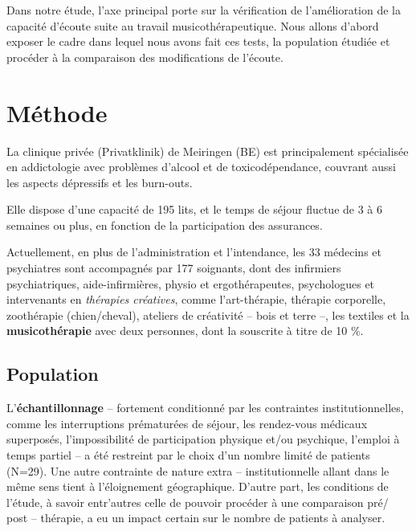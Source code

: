 
Dans notre étude, l'axe principal porte sur la
vérification de l'amélioration de
la capacité d'écoute suite au travail musicothérapeutique.
Nous allons
d'abord exposer le cadre dans lequel nous avons fait ces tests, la
population étudiée et procéder à la comparaison des modifications de
l'écoute.

\section{Méthode}

 La clinique privée (Privatklinik)
de Meiringen (BE) est  principalement spécialisée en
addictologie avec problèmes d'alcool et de toxicodépendance, couvrant aussi les aspects dépressifs
et les
burn-outs.


Elle dispose d'une capacité de 195 lits, et le temps de séjour fluctue de 3 à 6 semaines ou plus, en
fonction de la participation des assurances.

Actuellement, en plus de l'administration et l'intendance, les 33
médecins et psychiatres sont
accompagnés par 177
soignants, dont des infirmiers psychiatriques, aide-infirmières, physio et
ergothérapeutes,
psychologues et intervenants en \textit{thérapies
créatives}, comme l'art-thérapie, thérapie
corporelle, zoothérapie (chien/cheval),  ateliers de créativité --
bois et terre --,  les textiles et la\textbf{ musicothérapie} avec deux
personnes, dont la souscrite à titre de 10 \%.








\subsection{Population}
L'\textbf{échantillonnage} -- fortement conditionné par les contraintes
institutionnelles, comme les interruptions prématurées de séjour, les rendez-vous
 médicaux superposés, l'impossibilité de participation physique et/ou
 psychique,
 l'emploi à
 temps partiel -- a été restreint  par le choix d'un nombre limité de
 patients (N=29).
Une autre contrainte de nature extra -- institutionnelle allant dans le
même sens tient à l'éloignement géographique.
D'autre part, les conditions de l'étude,
à savoir entr'autres celle de pouvoir procéder à une comparaison pré/ post -- thérapie, a eu un impact certain sur le nombre de patients à analyser.


